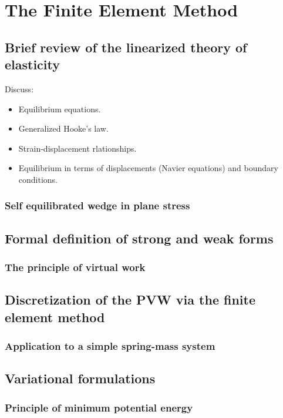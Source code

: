 \cleardoublepage {}
\chapter{The Finite Element Method}
\section{Brief review of the linearized theory of elasticity}
Discuss:
\begin{itemize}
\item Equilibrium equations.
\item Generalized Hooke's law.
\item Strain-displacement rlationships.
\item Equilibrium in terms of displacements (Navier equations) and boundary conditions.
\end{itemize}

\subsection*{Self equilibrated wedge in plane stress}

\section{Formal definition of strong and weak forms}

\subsection{The principle of virtual work}

\section{Discretization of the PVW via the finite element method}
\subsection*{Application to a simple spring-mass system}

\section{Variational formulations}
\subsection{Principle of minimum potential energy}
